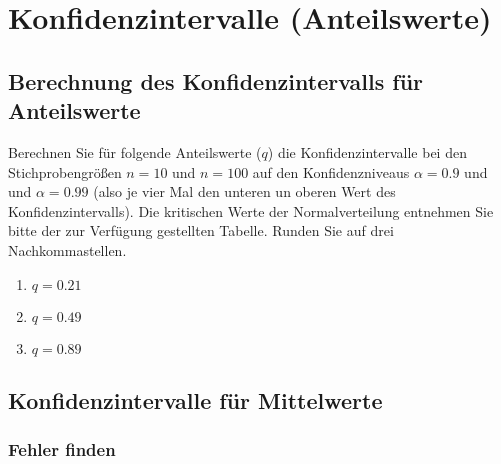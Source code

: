 \section{Konfidenzintervalle (Anteilswerte)}

\subsection{Berechnung des Konfidenzintervalls für Anteilswerte}

Berechnen Sie für folgende Anteilswerte ($q$) die Konfidenzintervalle bei den Stichprobengrößen $n=10$ und $n=100$ auf den Konfidenzniveaus $\alpha=0.9$ und und $\alpha=0.99$ (also je vier Mal den unteren un oberen Wert des Konfidenzintervalls).
Die kritischen Werte der Normalverteilung entnehmen Sie bitte der zur Verfügung gestellten Tabelle.
Runden Sie auf drei Nachkommastellen.

\begin{enumerate}
  \item $q=0.21$ 
  \item $q=0.49$
  \item $q=0.89$
\end{enumerate}



\subsection{Konfidenzintervalle für Mittelwerte}

\subsubsection{Fehler finden}

